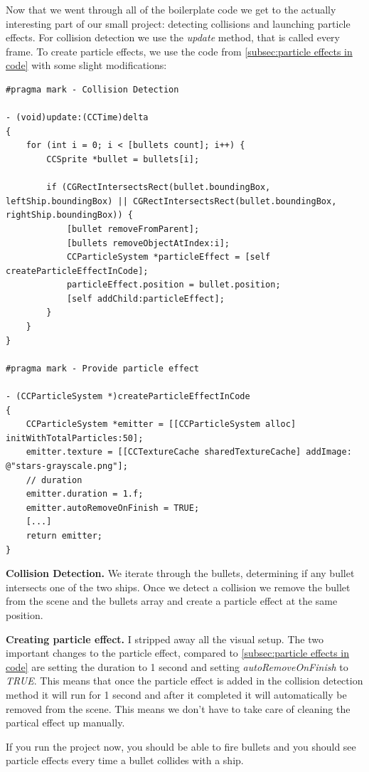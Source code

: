Now that we went through all of the
boilerplate code we get to the actually interesting part of our small project:
detecting collisions and launching particle effects.
For collision detection we use the \textit{update} method, that is called every
frame. To create particle effects, we use the code from \ref{subsec:particle
effects in code} with some slight modifications:
\begin{lstlisting}
#pragma mark - Collision Detection

- (void)update:(CCTime)delta
{
    for (int i = 0; i < [bullets count]; i++) {
        CCSprite *bullet = bullets[i];
        
        if (CGRectIntersectsRect(bullet.boundingBox, leftShip.boundingBox) || CGRectIntersectsRect(bullet.boundingBox, rightShip.boundingBox)) {
            [bullet removeFromParent];
            [bullets removeObjectAtIndex:i];
            CCParticleSystem *particleEffect = [self createParticleEffectInCode];
            particleEffect.position = bullet.position;
            [self addChild:particleEffect];
        }
    }
}
 
#pragma mark - Provide particle effect

- (CCParticleSystem *)createParticleEffectInCode
{
    CCParticleSystem *emitter = [[CCParticleSystem alloc] initWithTotalParticles:50];
	emitter.texture = [[CCTextureCache sharedTextureCache] addImage: @"stars-grayscale.png"];
	// duration
	emitter.duration = 1.f;
    emitter.autoRemoveOnFinish = TRUE;
	[...]
	return emitter;
}
\end{lstlisting}

\textbf{Collision
Detection.} We iterate through the bullets, determining if any bullet intersects one of the two ships. Once we detect a collision we remove the
bullet from the scene and the bullets array and create a particle effect at the
same position.

\textbf{Creating particle effect.} I stripped away all the visual setup. The two
important changes to the particle effect, compared to \ref{subsec:particle
effects in code} are setting the duration to 1 second and setting
\textit{autoRemoveOnFinish} to \textit{TRUE}. This means that once the particle
effect is added in the collision detection method it will run for 1 second and
after it completed it will automatically be removed from the scene. This means
we don't have to take care of cleaning the partical effect up manually.

If you run the project now, you should be able to fire bullets and you should
see particle effects every time a bullet collides with a ship.

